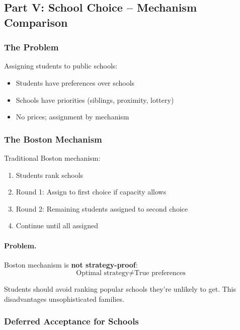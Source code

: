 \subsection{Part V: School Choice – Mechanism Comparison}

\subsubsection{The Problem}

Assigning students to public schools:
\begin{itemize}
    \item Students have preferences over schools
    \item Schools have priorities (siblings, proximity, lottery)
    \item No prices; assignment by mechanism
\end{itemize}

\subsubsection{The Boston Mechanism}

Traditional Boston mechanism:
\begin{enumerate}
    \item Students rank schools
    \item Round 1: Assign to first choice if capacity allows
    \item Round 2: Remaining students assigned to second choice
    \item Continue until all assigned
\end{enumerate}

\paragraph{Problem.}
Boston mechanism is \textbf{not strategy-proof}:
\begin{equation}
\text{Optimal strategy} \neq \text{True preferences}
\end{equation}

Students should avoid ranking popular schools they're unlikely to get.
This disadvantages unsophisticated families.

\subsubsection{Deferred Acceptance for Schools}

